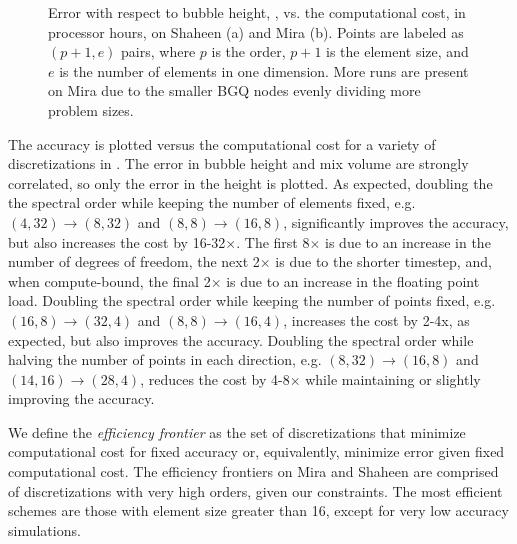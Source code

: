\begin{figure}


\caption{ 
Error with respect to bubble height, , vs. the computational cost, in processor hours, on Shaheen (a) and Mira (b).
Points are labeled as $(p+1, e)$ pairs, where $p$ is the order, $p+1$ is the element size, and $e$ is the number of elements in one dimension.
More runs are present on Mira due to the smaller BGQ nodes evenly dividing more problem sizes.
}
\end{figure}

The accuracy is plotted versus the computational cost for a variety of discretizations in .
The error in bubble height and mix volume are strongly correlated, so only the error in the height is plotted.
As expected, doubling the the spectral order while keeping the number of elements fixed, e.g. $(4,32) \rightarrow (8,32)$ and $(8,8) \rightarrow (16,8)$, significantly improves the accuracy, but also increases the cost by 16-32$\times$.
The first 8$\times$ is due to an increase in the number of degrees of freedom, the next 2$\times$ is due to the shorter timestep, and, when compute-bound, the final 2$\times$ is due to an increase in the floating point load.
Doubling the spectral order while keeping the number of points fixed, e.g. $(16, 8) \rightarrow (32,4)$  and $(8,8) \rightarrow (16,4)$, increases the cost by 2-4x, as expected, but also improves the accuracy.
Doubling the spectral order while halving the number of points in each direction, e.g. $(8,32) \rightarrow (16,8)$ and $(14, 16) \rightarrow (28, 4)$, reduces the cost by 4-8$\times$ while maintaining or slightly improving the accuracy.

We define the \emph{efficiency frontier} as the set of discretizations that minimize computational cost for fixed accuracy or, equivalently, minimize error given fixed computational cost.
The efficiency frontiers on Mira and Shaheen are comprised of discretizations with very high orders, given our constraints.
The most efficient schemes are those with element size greater than 16, except for very low accuracy simulations.

